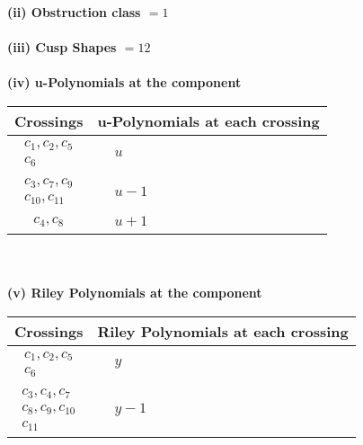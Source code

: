 \documentclass[1p]{elsarticle_modified}
\theoremstyle{definition}
\begin{document}
\flushleft \textbf{(ii) Obstruction class $= 1$}\\~\\
\flushleft \textbf{(iii) Cusp Shapes $= 12$}\\~\\
\newpage\renewcommand{\arraystretch}{1}
\flushleft \textbf{(iv) u-Polynomials at the component}\newline \\
\begin{tabular}{m{50pt}|m{274pt}}
Crossings & \hspace{64pt}u-Polynomials at each crossing \\
\hline $$\begin{aligned}c_{1},c_{2},c_{5}\\c_{6}\end{aligned}$$&$\begin{aligned}
&u
\end{aligned}$\\
\hline $$\begin{aligned}c_{3},c_{7},c_{9}\\c_{10},c_{11}\end{aligned}$$&$\begin{aligned}
&u-1
\end{aligned}$\\
\hline $$\begin{aligned}c_{4},c_{8}\end{aligned}$$&$\begin{aligned}
&u+1
\end{aligned}$\\
\hline
\end{tabular}\\~\\
\newpage\renewcommand{\arraystretch}{1}
\flushleft \textbf{(v) Riley Polynomials at the component}\newline \\
\begin{tabular}{m{50pt}|m{274pt}}
Crossings & \hspace{64pt}Riley Polynomials at each crossing \\
\hline $$\begin{aligned}c_{1},c_{2},c_{5}\\c_{6}\end{aligned}$$&$\begin{aligned}
&y
\end{aligned}$\\
\hline $$\begin{aligned}c_{3},c_{4},c_{7}\\c_{8},c_{9},c_{10}\\c_{11}\end{aligned}$$&$\begin{aligned}
&y-1
\end{aligned}$\\
\hline
\end{tabular}\\~\\
\end{document}
